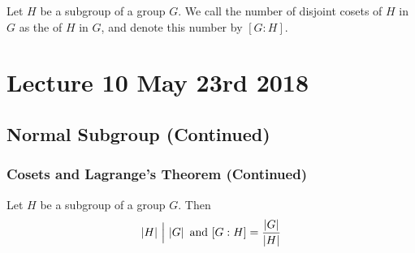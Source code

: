 \documentclass[notoc,notitlepage]{tufte-book}
\begin{document}
\begin{defn}[Index]
\label{defn:index}
  Let $H$ be a subgroup of a group $G$. We call the number of disjoint cosets of $H$ in $G$ as the  of $H$ in $G$, and denote this number by $[G : H]$.
\end{defn}




\chapter{Lecture 10 May 23rd 2018}%
\label{chp:lecture_10_may_23rd_2018}

\section{Normal Subgroup (Continued)}%
\label{sec:normal_subgroup_continued}

\subsection{Cosets and Lagrange's Theorem (Continued)}%
\label{sub:cosets_and_lagrange_s_theorem_continued}

\begin{thm}
\label{thm:lagrange_s_theorem}
  Let $H$ be a subgroup of a  group $G$. Then
  \begin{equation*}
    \left|H\right| \, \Big| \, \left|G\right| \text{ and } [G : H] = \frac{\left|G\right|}{\left|H\right|}
  \end{equation*}
\end{thm}
\end{document}
